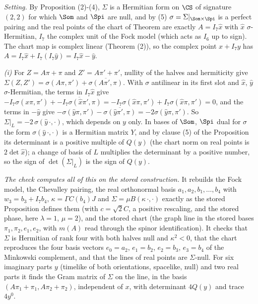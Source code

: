 \emph{Setting.} By Proposition (2)-(4), $\Sigma$ is a Hermitian form on $\CS$ of signature $(2,2)$ for which $\Som$ and $\Spi$ are null, and by (5) $\sigma = \Sigma|_{\Som\times\Spi}$ is a perfect pairing and the real points of the chart of Theorem  are exactly $A = I_{7}\hat x$ with $\hat x$ $\sigma$-Hermitian, $I_{7}$ the complex unit of the Fock model (which acts as $I_{6}$ up to sign). The chart map is complex linear (Theorem (2)), so the complex point $x + I_{7}y$ has $A = I_{7}\hat x + I_{7}(I_{7}\hat y) = I_{7}\hat x - \hat y$.

\emph{(i)} For $Z = A\pi + \pi$ and $Z' = A\pi' + \pi'$, nullity of the halves and hermiticity give $\Sigma(Z, Z') = \sigma(A\pi, \pi') + \overline{\sigma(A\pi', \pi)}$. With $\sigma$ antilinear in its first slot and $\hat x$, $\hat y$ $\sigma$-Hermitian, the terms in $I_{7}\hat x$ give $-I_{7}\sigma(\hat x\pi,\pi') + \overline{-I_{7}\sigma(\hat x\pi',\pi)} = -I_{7}\sigma(\hat x\pi,\pi') + I_{7}\sigma(\hat x\pi,\pi') = 0$, and the terms in $-\hat y$ give $-\sigma(\hat y\pi,\pi') - \overline{\sigma(\hat y\pi',\pi)} = -2\sigma(\hat y\pi,\pi')$. So $\Sigma|_{L} = -2\,\sigma(\hat y\,\cdot,\cdot)$, which depends on $y$ only. In bases of $\Som$, $\Spi$ dual for $\sigma$ the form $\sigma(\hat y\,\cdot,\cdot)$ is a Hermitian matrix $Y$, and by clause (5) of the Proposition its determinant is a positive multiple of $Q(y)$ (the chart norm on real points is $2\det\hat x$); a change of basis of $L$ multiplies the determinant by a positive number, so the sign of $\det(\Sigma|_{L})$ is the sign of $Q(y)$.

\emph{The check computes all of this on the stored construction.} It rebuilds the Fock model, the Chevalley pairing, the real orthonormal basis $a_{1}, a_{2}, b_{1}, \dots, b_{4}$ with $w_{3} = b_{3} + I_{7}b_{4}$, $\kappa = \Gamma C(b_{4})J$ and $\Sigma = \mu B(\kappa\,\cdot,\cdot)$ exactly as the stored Proposition defines them (with $c = \sqrt{2}C$, a positive rescaling, and the stored phase, here $\lambda = 1$, $\mu = 2$), and the stored chart (the graph line in the stored bases $\pi_{1}, \pi_{2}, e_{1}, e_{2}$, with $m(A)$ read through the spinor identification). It checks that $\Sigma$ is Hermitian of rank four with both halves null and $\kappa^{2} < 0$, that the chart reproduces the four basis vectors $e_{0} = a_{2}$, $e_{1} = b_{2}$, $e_{2} = b_{3}$, $e_{3} = b_{4}$ of the Minkowski complement, and that the lines of real points are $\Sigma$-null. For six imaginary parts $y$ (timelike of both orientations, spacelike, null) and two real parts it finds the Gram matrix of $\Sigma$ on the line, in the basis $(A\pi_{1} + \pi_{1}, A\pi_{2} + \pi_{2})$, independent of $x$, with determinant $4Q(y)$ and trace $4y^{0}$.

